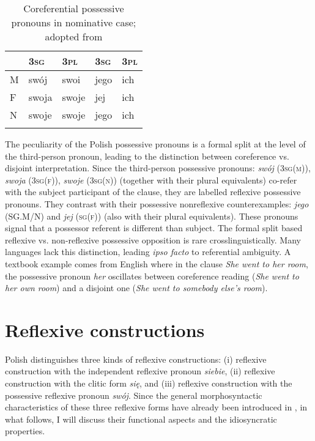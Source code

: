 \documentclass[output=paper]{langscibook}
\begin{document}
\begin{table}[ht]
 \centering
 \begin{tabular}{p{2cm}p{2cm}p{2cm}p{2cm}p{2cm}}
 \lsptoprule
 \textsc{} & \textsc{3sg} & \textsc{3pl} & \textsc{3sg} & \textsc{3pl} \\
 \midrule
 \textsc{M} & swój	& swoi	& jego	& ich \\
 \textsc{F} & swoja	& swoje	& jej	& ich \\
 \textsc{N} & swoje	& swoje	& jego	& ich \\
 \lspbottomrule
 \end{tabular}
 \caption{Coreferential possessive pronouns in nominative case; adopted from \citet[519]{Wiemer2007}}
 \label{tab:Janic:5}
\end{table}

The peculiarity of the Polish possessive pronouns is a formal split at the level of the third-person pronoun, leading to the distinction between coreference vs. disjoint interpretation. Since the third-person possessive pronouns: \textit{swój} (\textsc{3sg(m)}), \textit{swoja} (\textsc{3sg(f)}), \textit{swoje} (\textsc{3sg(n)}) (together with their plural equivalents) co-refer with the subject participant of the clause, they are labelled reflexive possessive pronouns. They contrast with their possessive nonreflexive counterexamples: \textit{jego} (\textsc{SG.M/N}) and \textit{jej} (\textsc{sg(f)}) (also with their plural equivalents). These pronouns signal that a possessor referent is different than subject. The formal split based reflexive vs. non-reflexive possessive opposition is rare crosslinguistically. Many languages lack this distinction, leading \textit{ipso facto} to referential ambiguity. A textbook example comes from English where in the clause \textit{She went to her room}, the possessive pronoun \textit{her} oscillates between coreference reading (\textit{She went to her own room}) and a disjoint one (\textit{She went to somebody else’s room}).


\section{Reflexive constructions} \label{sec:Janic:3}

Polish distinguishes three kinds of reflexive constructions: (i) reflexive construction with the independent reflexive pronoun \textit{siebie}, (ii) reflexive construction with the clitic form \textit{się}, and (iii) reflexive construction with the possessive reflexive pronoun \textit{swój}. Since the general morphosyntactic characteristics of these three reflexive forms have already been introduced in , in what follows, I will discuss their functional aspects and the idiosyncratic properties. 
\end{document}

